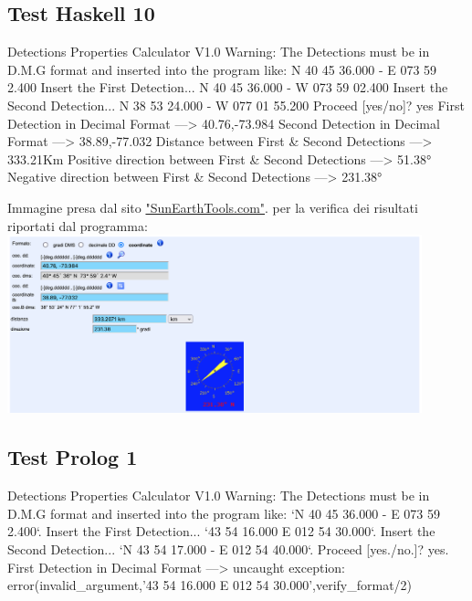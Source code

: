 \documentclass{article}
\begin{document}
\subsection*{Test Haskell 10}
	\begin{spverbatim}
		Detections Properties Calculator V1.0 
		Warning: The Detections must be in D.M.G format and inserted into the program like: N 40 45 36.000 - E 073 59 2.400
		Insert the First Detection...
		N 40 45 36.000 - W 073 59 02.400
		Insert the Second Detection...
		N 38 53 24.000 - W 077 01 55.200
		Proceed [yes/no]?
		yes
		First Detection in Decimal Format ---> 40.76,-73.984
		Second Detection in Decimal Format ---> 38.89,-77.032
		Distance between First & Second Detections ---> 333.21Km
		Positive direction between First & Second Detections ---> 51.38°
		Negative direction between First & Second Detections ---> 231.38°
	\end{spverbatim}
	\bigskip
	Immagine presa dal sito \href{https://www.sunearthtools.com/it/tools/distance.php}{"SunEarthTools.com"}. per la verifica dei risultati riportati dal programma:\\
	\includegraphics[width=0.9\textwidth]{Haskell_Tests/10-Calculation_of_Distant_Coordinates_Check}
	
\newpage
\subsection*{Test Prolog 1}
	\begin{spverbatim}
		Detections Properties Calculator V1.0
		Warning: The Detections must be in D.M.G format and inserted into the program like: `N 40 45 36.000 - E 073 59 2.400`.
		Insert the First Detection...
		`43 54 16.000  E 012 54 30.000`.
		Insert the Second Detection...
		`N 43 54 17.000 - E 012 54 40.000`.
		Proceed [yes./no.]?
		yes.
		First Detection in Decimal Format ---> 
		uncaught exception: error(invalid_argument,'43 54 16.000  E 012 54 30.000',verify_format/2)
	\end{spverbatim}
\end{document}
